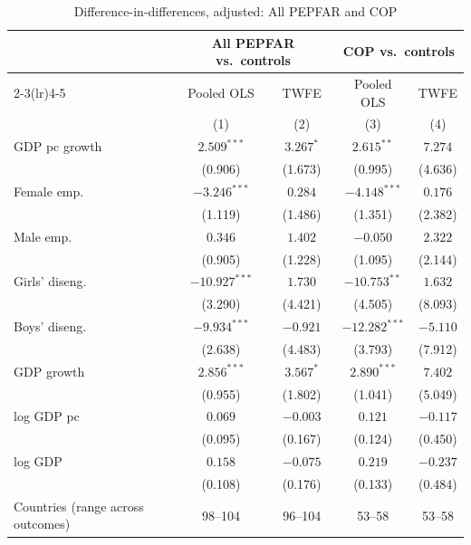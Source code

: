 \begin{table}[htbp]
\centering
\caption{Difference-in-differences, adjusted: All PEPFAR and COP}
\label{tab:did_combined}
\begin{tabular}{lcccc}
\toprule
 & \multicolumn{2}{c}{All PEPFAR vs.\ controls} & \multicolumn{2}{c}{COP vs.\ controls} \\
\cmidrule(lr){2-3}\cmidrule(lr){4-5}
 & Pooled OLS & TWFE & Pooled OLS & TWFE \\
 & (1) & (2) & (3) & (4) \\
\midrule
GDP pc growth & $2.509^{***}$ & $3.267^{*}$ & $2.615^{**}$ & $7.274$ \\
 & (0.906) & (1.673) & (0.995) & (4.636) \\
Female emp. & $-3.246^{***}$ & $0.284$ & $-4.148^{***}$ & $0.176$ \\
 & (1.119) & (1.486) & (1.351) & (2.382) \\
Male emp. & $0.346$ & $1.402$ & $-0.050$ & $2.322$ \\
 & (0.905) & (1.228) & (1.095) & (2.144) \\
Girls' diseng. & $-10.927^{***}$ & $1.730$ & $-10.753^{**}$ & $1.632$ \\
 & (3.290) & (4.421) & (4.505) & (8.093) \\
Boys' diseng. & $-9.934^{***}$ & $-0.921$ & $-12.282^{***}$ & $-5.110$ \\
 & (2.638) & (4.483) & (3.793) & (7.912) \\
GDP growth & $2.856^{***}$ & $3.567^{*}$ & $2.890^{***}$ & $7.402$ \\
 & (0.955) & (1.802) & (1.041) & (5.049) \\
log GDP pc & $0.069$ & $-0.003$ & $0.121$ & $-0.117$ \\
 & (0.095) & (0.167) & (0.124) & (0.450) \\
log GDP & $0.158$ & $-0.075$ & $0.219$ & $-0.237$ \\
 & (0.108) & (0.176) & (0.133) & (0.484) \\
\midrule
Countries (range across outcomes) & 98--104 & 96--104 & 53--58 & 53--58 \\
\bottomrule
\end{tabular}
\par\vspace{4pt}

\end{table}
